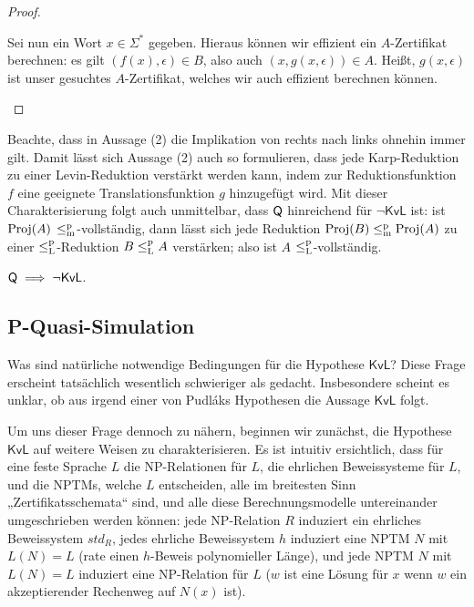 \begin{proof}
\begin{prooflist}
    Sei nun ein Wort $x\in\Sigma^*$ gegeben. Hieraus können wir effizient ein $A$-Zertifikat berechnen: es gilt $(f(x),\epsilon)\in B$, also auch $(x, g(x, \epsilon))\in A$. Heißt, $g(x, \epsilon)$ ist unser gesuchtes $A$-Zertifikat, welches wir auch effizient berechnen können.
\end{prooflist}
\end{proof}

Beachte, dass in Aussage (2) die Implikation von rechts nach links ohnehin immer gilt. 
Damit lässt sich Aussage (2) auch so formulieren, dass jede Karp-Reduktion zu einer Levin-Reduktion verstärkt werden kann, indem zur Reduktionsfunktion $f$ eine geeignete Translationsfunktion $g$ hinzugefügt wird.
Mit dieser Charakterisierung folgt auch unmittelbar, dass $\mathsf{Q}$ hinreichend für $\neg\mathsf{KvL}$ ist: ist $\operatorname{Proj}(A)$ $\leq_\mathrm{m}^\mathrm{p}$-vollständig, dann lässt sich jede Reduktion $\operatorname{Proj}(B)\leq_\mathrm{m}^\mathrm{p} \operatorname{Proj}(A)$ zu einer $\leq_\mathrm{L}^\mathrm{p}$-Reduktion $B\leq_\mathrm{L}^\mathrm{p} A$ verstärken; also ist $A$ $\leq_\mathrm{L}^\mathrm{p}$-vollständig.


\begin{corollary}\label{cor:kvl-implies-q}
    $\mathsf{Q}\implies \neg\mathsf{KvL}$.
\end{corollary}

\subsection*{P-Quasi-Simulation}

Was sind natürliche notwendige Bedingungen für die Hypothese $\mathsf{KvL}$? Diese Frage erscheint tatsächlich wesentlich schwieriger als gedacht. Insbesondere scheint es unklar, ob aus irgend einer von Pudláks Hypothesen die Aussage $\mathsf{KvL}$ folgt.

Um uns dieser Frage dennoch zu nähern, beginnen wir zunächst, die Hypothese $\mathsf{KvL}$ auf weitere Weisen zu charakterisieren. Es ist intuitiv ersichtlich, dass für eine feste Sprache $L$ die NP-Relationen für $L$, die ehrlichen Beweissysteme für $L$, und die NPTMs, welche $L$ entscheiden, alle im breitesten Sinn „Zertifikatsschemata“ sind, und alle diese Berechnungsmodelle untereinander umgeschrieben werden können: jede NP-Relation $R$ induziert ein ehrliches Beweissystem $\mathit{std}_R$, jedes ehrliche Beweissystem $h$ induziert eine NPTM $N$ mit $L(N)=L$ (rate einen $h$-Beweis polynomieller Länge), und jede NPTM $N$ mit $L(N)=L$ induziert eine NP-Relation für $L$ ($w$ ist eine Lösung für $x$ wenn $w$ ein akzeptierender Rechenweg auf $N(x)$ ist).

